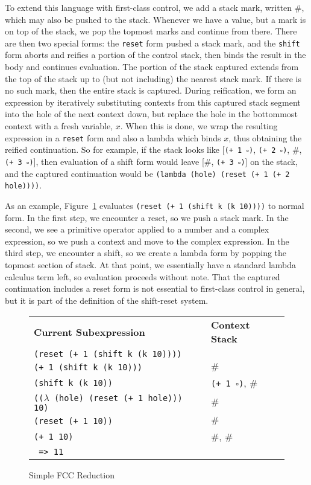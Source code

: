 \documentclass[11pt]{article}
\begin{document}
To extend this language with first-class control, we add a stack mark, written $\#$, which may also be pushed to the stack.
Whenever we have a value, but a mark is on top of the stack, we pop the topmost marks and continue from there.
There are then two special forms:
the \texttt{reset} form pushed a stack mark, and the \texttt{shift} form aborts and reifies a portion of the control stack, then binds the result in the body and continues evaluation.
The portion of the stack captured extends from the top of the stack up to (but not including) the nearest stack mark.
If there is no such mark, then the entire stack is captured.
During reification, we form an expression by iteratively substituting contexts from this captured stack segment into the hole of the next context down, but replace the hole in the bottommost context with a fresh variable, $x$.
When this is done, we wrap the resulting expression in a \texttt{reset} form and also a lambda which binds $x$, thus obtaining the reified continuation.
So for example, if the stack looks like [\texttt{(+ 1 $\square$)}, \texttt{(+ 2 $\square$)}, $\#$, \texttt{(+ 3 $\square$)}], then evaluation of a shift form would leave [$\#$, \texttt{(+ 3 $\square$)}] on the stack, and the captured continuation would be \texttt{(lambda (hole) (reset (+ 1 (+ 2 hole))))}.

As an example, Figure~\ref{fig:simple-fcc-reduction} evaluates \texttt{(reset (+ 1 (shift k (k 10))))} to normal form.
In the first step, we encounter a reset, so we push a stack mark.
In the second, we see a primitive operator applied to a number and a complex expression, so we push a context and move to the complex expression.
In the third step, we encounter a shift, so we create a lambda form by popping the topmost section of stack.
At that point, we essentially have a standard lambda calculus term left, so evaluation proceeds without note.
That the captured continuation includes a reset form is not essential to first-class control in general, but it is part of the definition of the shift-reset system.

\begin{figure}[H]
\caption{Simple FCC Reduction}
\label{fig:simple-fcc-reduction}
\begin{tabular}{ll}
\textbf{Current Subexpression} & \textbf{Context Stack} \\
\texttt{(reset (+ 1 (shift k (k 10))))} & \\
\texttt{(+ 1 (shift k (k 10)))} & $\#$ \\
\texttt{(shift k (k 10))} & \texttt{(+ 1 $\square$)}, $\#$ \\
\texttt{(($\lambda$ (hole) (reset (+ 1 hole))) 10)} & $\#$ \\
\texttt{(reset (+ 1 10))} & $\#$ \\
\texttt{(+ 1 10)} & $\#$, $\#$ \\
\texttt{ => 11} \\
\end{tabular}
\end{figure}
\end{document}
